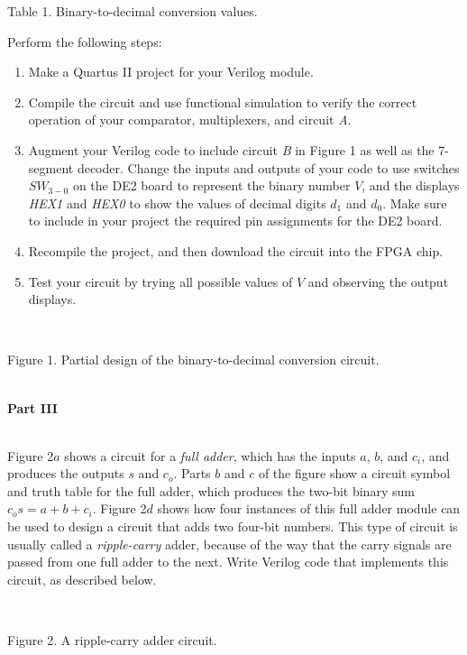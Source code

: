 \documentclass[psfig,10pt,fullpage]{article}
\begin{document}
\begin{center}
Table 1. Binary-to-decimal conversion values.
\end{center}

Perform the following steps:

\begin{enumerate}
\item Make a Quartus II project for your Verilog module.
\item Compile the circuit and use functional simulation to verify the correct operation of
your comparator, multiplexers, and circuit {\it A}.
\item Augment your Verilog code to include circuit {\it B} in Figure 1 as well as the 7-segment
decoder. Change the inputs and outputs of your code to use switches $SW_{3-0}$ on the DE2
board to represent the binary number $V$, and the displays {\it HEX1} and {\it HEX0}
to show the values of decimal digits $d_1$ and $d_0$. Make sure to include in your 
project the required pin assignments for the DE2 board.
\item Recompile the project, and then download the circuit into the FPGA chip.
\item Test your circuit by trying all possible values of $V$ and observing the output
displays.
\end{enumerate}

\begin{figure}[H]
\scriptsize
\centerline{
\hbox{}}
\end{figure}
~\\
\centerline{Figure 1.  Partial design of the binary-to-decimal conversion circuit.}

~\\
\noindent
{\bf Part III}

~\\
Figure 2$a$ shows a circuit for a {\it full adder}, which has the inputs $a$, $b$, and $c_i$,
and produces the outputs $s$ and $c_o$. Parts $b$ and $c$ of the figure show a circuit
symbol and truth table for the full adder, which produces the two-bit binary sum
$c_o s = a + b + c_i$. Figure 2$d$ shows how four instances of this full adder module
can be used to design a circuit that adds two four-bit numbers. This type of circuit is
usually called a {\it ripple-carry} adder, because of the way that the carry signals are 
passed from one full adder to the next. Write Verilog code that implements this circuit,
as described below.

\begin{figure}[H]
\scriptsize
\centerline{
\hbox{}}
\end{figure}
~\\
\centerline{Figure 2.  A ripple-carry adder circuit.}
~\\
\end{document}
